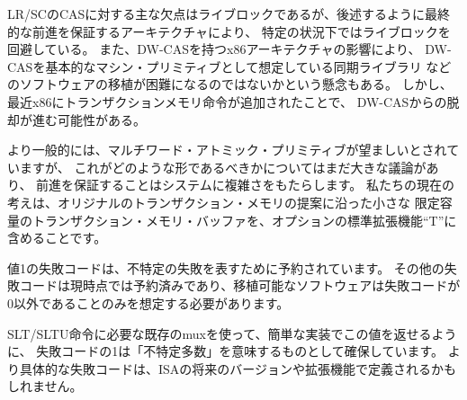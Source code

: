 \begin{commentary}
LR/SCのCASに対する主な欠点はライブロックであるが、後述するように最終的な前進を保証するアーキテクチャにより、
特定の状況下ではライブロックを回避している。
また、DW-CASを持つx86アーキテクチャの影響により、
DW-CASを基本的なマシン・プリミティブとして想定している同期ライブラリ
などのソフトウェアの移植が困難になるのではないかという懸念もある。
しかし、最近x86にトランザクションメモリ命令が追加されたことで、
DW-CASからの脱却が進む可能性がある。

\begin{comment}
More generally, a multi-word atomic primitive is desirable, but there is
still considerable debate about what form this should take, and
guaranteeing forward progress adds complexity to a system.  Our
current thoughts are to include a small limited-capacity transactional
memory buffer along the lines of the original transactional memory
proposals as an optional standard extension ``T''.
\end{comment}

より一般的には、マルチワード・アトミック・プリミティブが望ましいとされていますが、
これがどのような形であるべきかについてはまだ大きな議論があり、
前進を保証することはシステムに複雑さをもたらします。
私たちの現在の考えは、オリジナルのトランザクション・メモリの提案に沿った小さな
限定容量のトランザクション・メモリ・バッファを、オプションの標準拡張機能``T''に含めることです。

\end{commentary}
\begin{comment}
The failure code with value 1 is reserved to encode an unspecified
failure.  Other failure codes are reserved at this time, and portable
software should only assume the failure code will be non-zero.
\end{comment}
値1の失敗コードは、不特定の失敗を表すために予約されています。
その他の失敗コードは現時点では予約済みであり、移植可能なソフトウェアは失敗コードが0以外であることのみを想定する必要があります。

\begin{commentary}
\begin{comment}
We reserve a failure code of 1 to mean ``unspecified'' so that simple
implementations may return this value using the existing mux required
for the SLT/SLTU instructions.  More specific failure codes might be
defined in future versions or extensions to the ISA.
\end{comment}
SLT/SLTU命令に必要な既存のmuxを使って、簡単な実装でこの値を返せるように、
失敗コードの1は「不特定多数」を意味するものとして確保しています。
より具体的な失敗コードは、ISAの将来のバージョンや拡張機能で定義されるかもしれません。
\end{commentary}


